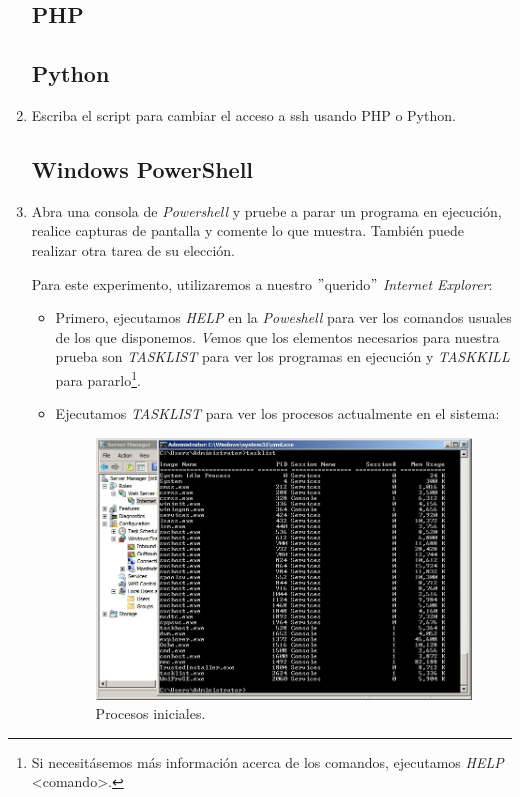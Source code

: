 \documentclass[paper=a4, fontsize=11pt]{scrartcl} %
\numberwithin{equation}{section} %
\numberwithin{figure}{section} %
\numberwithin{table}{section} %
\begin{document}
\begin{enumerate}
	\subsection{PHP}
	\subsection{Python}
		\item Escriba el script para cambiar el acceso a ssh usando PHP o Python.
	
	\subsection{Windows PowerShell}
		\item Abra una consola de \textit{Powershell} y pruebe a parar un programa en ejecución,
		realice capturas de pantalla y comente lo que muestra. También puede realizar otra tarea de
		su elección.
		
		Para este experimento, utilizaremos a nuestro $"$querido$"$ \textit{Internet Explorer}:
		
		\begin{itemize}
			\item Primero, ejecutamos \textit{HELP} en la \textit{Poweshell} para ver los comandos
			usuales de los que disponemos.
			\textit Vemos que los elementos necesarios para nuestra prueba son \textit{TASKLIST} para
			ver los programas en ejecución y \textit{TASKKILL} para pararlo\footnote{Si necesitásemos
			más información acerca de los comandos, ejecutamos \textit{HELP} <comando>.}.
			\item Ejecutamos \textit{TASKLIST} para ver los procesos actualmente en el sistema:
			
			\begin{figure}[H]
				\centering
				\includegraphics[width=15cm]{Ejercicio_25a.jpg}
				\caption{Procesos iniciales.}
				\label{fig:list}
			\end{figure}
			

\end{itemize}
\end{enumerate}
\end{document}
